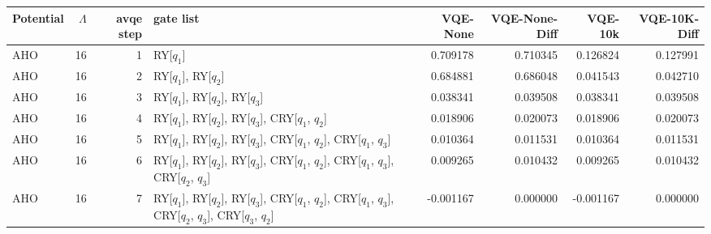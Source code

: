 \begin{tabular}{lrrlrrrr}
\toprule
Potential & $\Lambda$ & avqe step & gate list & VQE-None & VQE-None-Diff & VQE-10k & VQE-10K-Diff \\
\midrule
AHO & 16 & 1 & RY[$q_1$] & 0.709178 & 0.710345 & 0.126824 & 0.127991 \\
AHO & 16 & 2 & RY[$q_1$], RY[$q_2$] & 0.684881 & 0.686048 & 0.041543 & 0.042710 \\
AHO & 16 & 3 & RY[$q_1$], RY[$q_2$], RY[$q_3$] & 0.038341 & 0.039508 & 0.038341 & 0.039508 \\
AHO & 16 & 4 & RY[$q_1$], RY[$q_2$], RY[$q_3$], CRY[$q_1$, $q_2$] & 0.018906 & 0.020073 & 0.018906 & 0.020073 \\
AHO & 16 & 5 & RY[$q_1$], RY[$q_2$], RY[$q_3$], CRY[$q_1$, $q_2$], CRY[$q_1$, $q_3$] & 0.010364 & 0.011531 & 0.010364 & 0.011531 \\
AHO & 16 & 6 & RY[$q_1$], RY[$q_2$], RY[$q_3$], CRY[$q_1$, $q_2$], CRY[$q_1$, $q_3$], CRY[$q_2$, $q_3$] & 0.009265 & 0.010432 & 0.009265 & 0.010432 \\
AHO & 16 & 7 & RY[$q_1$], RY[$q_2$], RY[$q_3$], CRY[$q_1$, $q_2$], CRY[$q_1$, $q_3$], CRY[$q_2$, $q_3$], CRY[$q_3$, $q_2$] & -0.001167 & 0.000000 & -0.001167 & 0.000000 \\
\bottomrule
\end{tabular}
